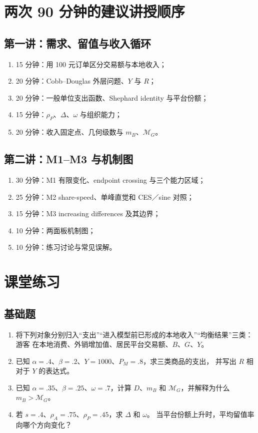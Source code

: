\documentclass[UTF8,11pt,scheme=chinese,fontset=fandol]{ctexart}
\newcommand{\MG}{\mathcal M_G}
\theoremstyle{definition}
\begin{document}
\section{两次 90 分钟的建议讲授顺序}

\subsection*{第一讲：需求、留值与收入循环}
\begin{enumerate}
  \item 15 分钟：用 100 元订单区分交易额与本地收入；
  \item 20 分钟：Cobb--Douglas 外层问题、\(Y\) 与 \(R\)；
  \item 20 分钟：一般单位支出函数、Shephard identity 与平台份额；
  \item 15 分钟：\(\rho_P\)、\(\Delta\)、\(\omega\) 与组织能力；
  \item 20 分钟：收入固定点、几何级数与 \(m_B\)、\(\MG\)。
\end{enumerate}

\subsection*{第二讲：M1--M3 与机制图}
\begin{enumerate}
  \item 30 分钟：M1 有限变化、endpoint crossing 与三个能力区域；
  \item 25 分钟：M2 share-speed、单峰直觉和 CES／sine 对照；
  \item 15 分钟：M3 increasing differences 及其边界；
  \item 10 分钟：两面板机制图；
  \item 10 分钟：练习讨论与常见误解。
\end{enumerate}

\section{课堂练习}

\subsection{基础题}
\begin{enumerate}
  \item 将下列对象分别归入“支出”“进入模型前已形成的本地收入”“均衡结果”三类：游客
  在本地消费、外销增加值、居民平台交易额、\(B\)、\(G\)、\(Y\)。

  \item 已知 \(\alpha=.4\)、\(\beta=.2\)、\(Y=1000\)、\(P_M=.8\)，求三类商品的支出，
  并写出 \(R\) 相对于 \(Y\) 的表达式。

  \item 已知 \(\alpha=.35\)、\(\beta=.25\)、\(\omega=.7\)，计算 \(D\)、\(m_B\) 和
  \(\MG\)，并解释为什么 \(m_B>\MG\)。

  \item 若 \(s=.4\)、\(\rho_A=.75\)、\(\rho_P=.45\)，求 \(\Delta\) 和 \(\omega\)。
  当平台份额上升时，平均留值率向哪个方向变化？
\end{enumerate}
\end{document}
